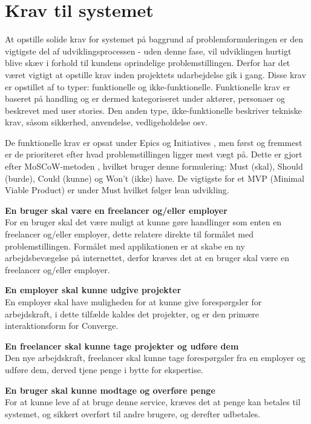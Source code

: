 \section{Krav til systemet}
\label{sec:system-requirements}

At opstille solide krav for systemet på baggrund af problemformuleringen er den vigtigste del af udviklingsprocessen - uden denne fase, vil udviklingen hurtigt blive skæv i forhold til kundens oprindelige problemstillingen. Derfor har det været vigtigt at opstille krav inden projektets udarbejdelse gik i gang. Disse krav er opstillet af to typer: funktionelle og ikke-funktionelle. Funktionelle krav er baseret på handling og er dermed kategoriseret under aktører, personaer og beskrevet med user stories. Den anden type, ikke-funktionelle beskriver tekniske krav, såsom sikkerhed, anvendelse, vedligeholdelse osv. 

De funktionelle krav er opsat under Epics og Initiatives \cite{documentation-kravspec}, men først og fremmest er de prioriteret efter hvad problemstillingen ligger mest vægt på. Dette er gjort efter MoSCoW-metoden \cite{documentation-kravspec}, hvilket bruger denne formulering: Must (skal), Should (burde), Could (kunne) og Won’t (ikke) have. De vigtigste for et MVP (Minimal Viable Product) \cite[MVP]{converge-terms} er under Must hvilket følger lean udvikling. 

\textbf{En bruger skal være en freelancer og/eller employer} \\
For en bruger skal det være muligt at kunne gøre handlinger som enten en freelancer og/eller employer, dette relatere direkte til formålet med problemstillingen. Formålet med applikationen er at skabe en ny arbejdsbevægelse på internettet, derfor kræves det at en bruger skal være en freelancer og/eller employer.

\textbf{En employer skal kunne udgive projekter} \\
En employer skal have muligheden for at kunne give forespørgsler for arbejdskraft, i dette tilfælde kaldes det projekter, og er den primære interaktionsform for Converge.

\textbf{En freelancer skal kunne tage projekter og udføre dem} \\
Den nye arbejdskraft, freelancer skal kunne tage forespørgsler fra en employer og udføre dem, derved tjene penge i bytte for ekspertise.

\textbf{En bruger skal kunne modtage og overføre penge} \\
For at kunne leve af at bruge denne service, kræves det at penge kan betales til systemet, og sikkert overført til andre brugere, og derefter udbetales.

